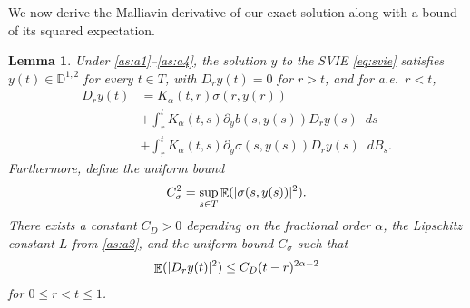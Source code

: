 \documentclass[11pt, a4paper]{article}
\theoremstyle{theoremstyle}
\newtheorem{lemma}[theorem]{Lemma}
\theoremstyle{definitionstyle}
\newcommand{\dd}{\mathop{}\!d}
\DeclareMathOperator{\EE}{\mathbb E}
\DeclarePairedDelimiter{\abs}{\lvert}{\rvert}
\begin{document}
We now derive the Malliavin derivative of our exact solution along with a bound of its squared expectation.
\begin{lemma}\label{lem:mall_dev_y}
    Under \ref{as:a1}--\ref{as:a4}, the solution $y$ to the SVIE \eqref{eq:svie} satisfies $y(t) \in \mathbb D^{1,2}$ for every $t \in T$, with $D_ry(t) = 0$ for $r > t$, and for a.e.\ $r < t$,
    \begin{equation}\label{eq:mall_dev_y}
    \begin{aligned}
        D_ry(t) &= K_\alpha(t, r)\sigma(r, y(r)) \\
        &+ \int_r^t K_\alpha(t, s)\partial_yb(s, y(s))D_ry(s)\dd{s} \\
        &+ \int_r^t K_\alpha(t, s)\partial_y\sigma(s, y(s))D_ry(s)\dd{B_s}.
    \end{aligned}
    \end{equation}
    Furthermore, define the uniform bound
    \begin{equation}\label{eq:Csigma}
        C_\sigma^2 = \sup_{s \in T} \EE (\abs{\sigma(s, y(s))}^2).
    \end{equation}
    There exists a constant $C_D > 0$ depending on the fractional order $\alpha$, the Lipschitz constant $L$ from \ref{as:a2}, and the uniform bound $C_\sigma$ such that
    \begin{equation}
        \EE (\abs{D_ry(t)}^2) \leq C_D(t - r)^{2\alpha - 2}
    \end{equation}
    for $0 \leq r < t \leq 1$.
\end{lemma}
\end{document}
